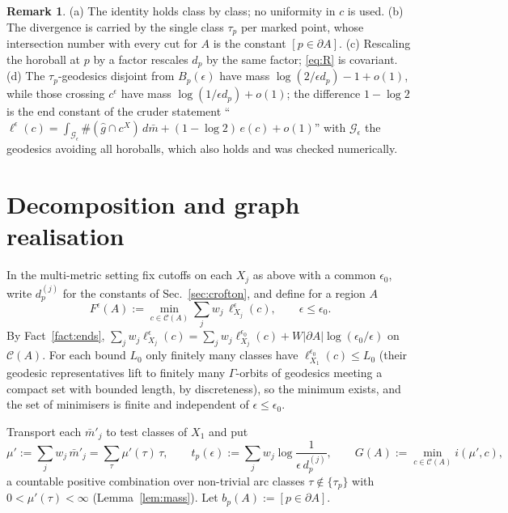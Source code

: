 \documentclass[aps,prd,onecolumn,superscriptaddress,nofootinbib,amsmath,amssymb,11pt]{revtex4-2}
\theoremstyle{definition}
\newtheorem{remark}[theorem]{Remark}
\newcommand{\Cut}{\mathcal{C}}
\newcommand{\eps}{\epsilon}
\newcommand{\G}{\mathcal{G}}
\newcommand{\mbar}{\bar m}
\begin{document}
\begin{remark}
(a) The identity holds class by class; no uniformity in $c$ is used. (b) The divergence is carried by the single
class $\tau_p$ per marked point, whose intersection number with every cut for $A$ is the constant $[p\in\partial A]$.
(c) Rescaling the horoball at $p$ by a factor rescales $d_p$ by the same factor; \eqref{eq:R} is covariant.
(d) The $\tau_p$-geodesics disjoint from $B_p(\eps)$ have mass $\log(2/\eps d_p)-1+o(1)$, while those crossing
$c^\eps$ have mass $\log(1/\eps d_p)+o(1)$; the difference $1-\log2$ is the end constant of the cruder statement
``$\ell^\eps(c)=\int_{\G_\eps}\#(\hat g\cap c^X)\,d\mbar+(1-\log2)\,e(c)+o(1)$'' with $\G_\eps$ the geodesics avoiding
all horoballs, which also holds and was checked numerically.
\end{remark}

\section{Decomposition and graph realisation}\label{sec:graph}

In the multi-metric setting fix cutoffs on each $X_j$ as above with a common $\eps_0$, write $d_p^{(j)}$ for the
constants of Sec.~\ref{sec:crofton}, and define for a region $A$
\begin{equation}\label{eq:F}
F^\eps(A):=\min_{c\in\Cut(A)}\sum_jw_j\,\ell^\eps_{X_j}(c),\qquad\eps\le\eps_0.
\end{equation}
By Fact~\ref{fact:ends}, $\sum_jw_j\ell^\eps_{X_j}(c)=\sum_jw_j\ell^{\eps_0}_{X_j}(c)+W|\partial A|\log(\eps_0/\eps)$ on
$\Cut(A)$. For each bound $L_0$ only finitely many classes have $\ell^{\eps_0}_{X_1}(c)\le L_0$ (their geodesic
representatives lift to finitely many $\Gamma$-orbits of geodesics meeting a compact set with bounded length, by
discreteness), so the minimum exists, and the set of minimisers is finite and independent of $\eps\le\eps_0$.

Transport each $\mbar'_j$ to test classes of $X_1$ and put
\begin{equation}\label{eq:mu}
\mu':=\sum_jw_j\,\mbar'_j=\sum_\tau\mu'(\tau)\,\tau,\qquad
t_p(\eps):=\sum_jw_j\log\frac{1}{\eps\,d_p^{(j)}},\qquad
G(A):=\min_{c\in\Cut(A)}i(\mu',c),
\end{equation}
a countable positive combination over non-trivial arc classes $\tau\notin\{\tau_p\}$ with $0<\mu'(\tau)<\infty$
(Lemma~\ref{lem:mass}). Let $b_p(A):=[p\in\partial A]$.
\end{document}
